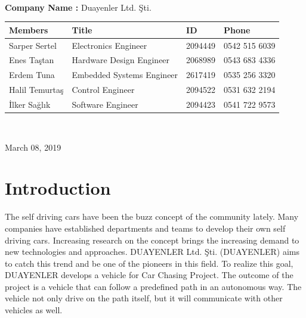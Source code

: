 \documentclass[a4paper,12pt]{article}
\begin{document}
\begin{titlepage}
\begin{minipage}[r]{0.35\textwidth}
		\end{minipage}\\[1cm]
		\begin{minipage}{\textwidth}
			\begin{flushleft}
				\large{\textbf{Company Name :}}	Duayenler Ltd. Şti.\\
				\begin{table}[H]
					\begin{tabular}{l l l l}
						\hline
						\textbf{Members} & \textbf{Title}            & \textbf{ID} & \textbf{Phone} \\ \hline
						Sarper Sertel    & Electronics Engineer      & 2094449     & 0542 515 6039  \\ 
						Enes Taştan     & Hardware Design Engineer  & 2068989     & 0543 683 4336  \\ 
						Erdem Tuna       & Embedded Systems Engineer & 2617419     & 0535 256 3320  \\ 
						Halil Temurtaş  & Control Engineer          & 2094522     & 0531 632 2194  \\
						İlker Sağlık  & Software Engineer         & 2094423     & 0541 722 9573  \\ \hline
						
						
					\end{tabular}
				\end{table}
			\end{flushleft}
		\end{minipage}\\[1cm]
		
		\begin{flushbottom}
			{\large March 08, 2019} %
		\end{flushbottom}
		
	\end{titlepage}
	
	\tableofcontents
	\newpage
	
	\section{Introduction}
	The self driving cars have been the buzz concept of the community lately. Many companies have established departments and teams to develop their own self driving cars. Increasing 
research on the concept brings the increasing demand to new technologies and approaches. DUAYENLER Ltd. Şti. (DUAYENLER) aims to catch this trend and be one of the pioneers in this field. To realize this goal, DUAYENLER develops a vehicle for Car Chasing Project. The outcome of the project is a vehicle that can follow a predefined path in an autonomous way. The vehicle not only drive on the path itself, but it will communicate with other vehicles as well.\\
	
\end{document}

